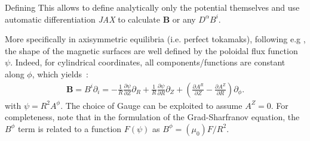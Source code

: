 Defining 
This allows to define analytically only the potential themselves and use automatic differentiation \textit{JAX} to calculate $\textbf{B}$ or any $D^\alpha B^i$.

More specifically in axisymmetric equilibria (i.e. perfect tokamaks), following e.g \cite[p.108]{wesson_tokamaks_2011}, the shape of the magnetic surfaces are well defined by the poloidal flux function $\psi$. Indeed, for cylindrical coordinates, all components/functions are constant along $\phi$, which yields~:
\begin{align*}
    \textbf{B} = B^i\partial_i = -\frac{1}{R}\frac{\partial\psi}{\partial Z}\partial_R +\frac{1}{R}\frac{\partial\psi}{\partial R}\partial_Z + \left(\frac{\partial A^R}{\partial Z} - \frac{\partial A^Z}{\partial R}\right)\partial_\phi.
\end{align*}
with $\psi = R^2 A^\phi$. The choice of Gauge can be exploited to assume $A^Z = 0$. For completeness, note that in the formulation of the Grad-Sharfranov equation, the $B^\phi$ term is related to a function $F(\psi)$ as $B^\phi = (\mu_0) F/R^2$.

